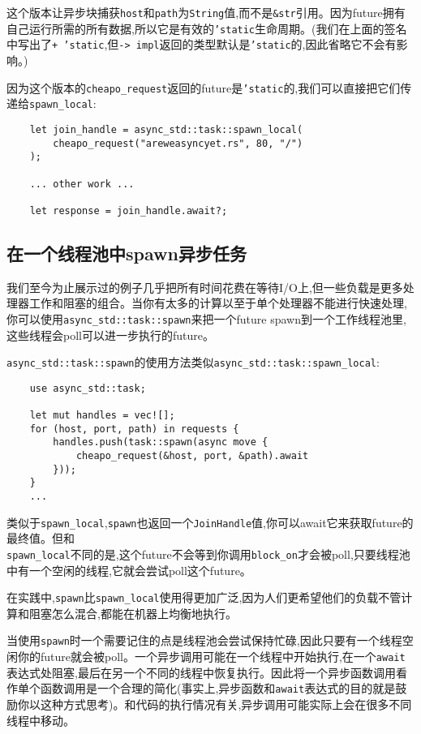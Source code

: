 这个版本让异步块捕获\texttt{host}和\texttt{path}为\texttt{String}值,而不是\texttt{\&str}引用。因为future拥有自己运行所需的所有数据,所以它是有效的\texttt{'static}生命周期。(我们在上面的签名中写出了\texttt{+ 'static},但\texttt{-> impl}返回的类型默认是\texttt{'static}的,因此省略它不会有影响。)

因为这个版本的\texttt{cheapo\_request}返回的future是\texttt{'static}的,我们可以直接把它们传递给\texttt{spawn\_local}:
\begin{verbatim}
    let join_handle = async_std::task::spawn_local(
        cheapo_request("areweasyncyet.rs", 80, "/")
    );

    ... other work ...

    let response = join_handle.await?;
\end{verbatim}

\subsection{在一个线程池中spawn异步任务}
我们至今为止展示过的例子几乎把所有时间花费在等待I/O上,但一些负载是更多处理器工作和阻塞的组合。当你有太多的计算以至于单个处理器不能进行快速处理,你可以使用\texttt{async\_std::task::spawn}来把一个future spawn到一个工作线程池里,这些线程会poll可以进一步执行的future。

\texttt{async\_std::task::spawn}的使用方法类似\texttt{async\_std::task::spawn\_local}:
\begin{verbatim}
    use async_std::task;

    let mut handles = vec![];
    for (host, port, path) in requests {
        handles.push(task::spawn(async move {
            cheapo_request(&host, port, &path).await
        }));
    }
    ...
\end{verbatim}

类似于\texttt{spawn\_local},\texttt{spawn}也返回一个\texttt{JoinHandle}值,你可以await它来获取future的最终值。但和\\
\texttt{spawn\_local}不同的是,这个future不会等到你调用\texttt{block\_on}才会被poll,只要线程池中有一个空闲的线程,它就会尝试poll这个future。

在实践中,\texttt{spawn}比\texttt{spawn\_local}使用得更加广泛,因为人们更希望他们的负载不管计算和阻塞怎么混合,都能在机器上均衡地执行。

当使用\texttt{spawn}时一个需要记住的点是线程池会尝试保持忙碌,因此只要有一个线程空闲你的future就会被poll。一个异步调用可能在一个线程中开始执行,在一个\texttt{await}表达式处阻塞,最后在另一个不同的线程中恢复执行。因此将一个异步函数调用看作单个函数调用是一个合理的简化(事实上,异步函数和\texttt{await}表达式的目的就是鼓励你以这种方式思考)。和代码的执行情况有关,异步调用可能实际上会在很多不同线程中移动。


